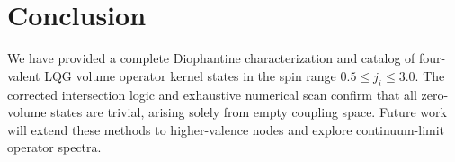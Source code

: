 \documentclass[11pt]{article}
\begin{document}
\section{Conclusion}
We have provided a complete Diophantine characterization and catalog of four-valent LQG volume operator kernel states in the spin range $0.5\le j_i\le3.0$. The corrected intersection logic and exhaustive numerical scan confirm that all zero-volume states are trivial, arising solely from empty coupling space. Future work will extend these methods to higher-valence nodes and explore continuum-limit operator spectra.



\end{document}
